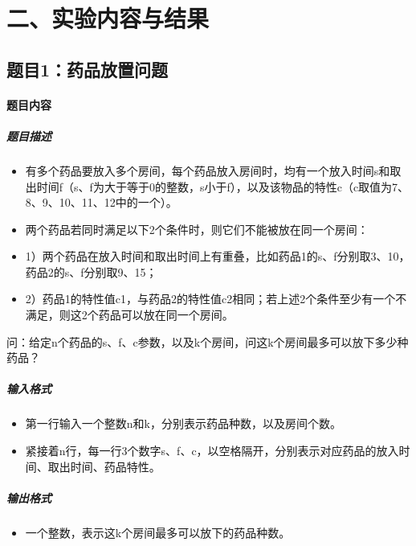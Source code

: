 \documentclass[12pt,a4paper]{ctexart}
\begin{document}
\vspace{5pt}

\section*{二、实验内容与结果}
\subsection*{题目1：药品放置问题}
\paragraph{题目内容}
\subparagraph{题目描述}
\begin{itemize}
    \item 有多个药品要放入多个房间，每个药品放入房间时，均有一个放入时间s和取出时间f（s、f为大于等于0的整数，s小于f），以及该物品的特性c（c取值为7、8、9、10、11、12中的一个）。
    \item 两个药品若同时满足以下2个条件时，则它们不能被放在同一个房间：
    \item 1）两个药品在放入时间和取出时间上有重叠，比如药品1的s、f分别取3、10，药品2的s、f分别取9、15；
    \item 2）药品1的特性值c1，与药品2的特性值c2相同；若上述2个条件至少有一个不满足，则这2个药品可以放在同一个房间。
\end{itemize}

问：给定n个药品的s、f、c参数，以及k个房间，问这k个房间最多可以放下多少种药品？

\subparagraph{输入格式}
    \begin{itemize}
        \item 第一行输入一个整数n和k，分别表示药品种数，以及房间个数。
        \item 紧接着n行，每一行3个数字s、f、c，以空格隔开，分别表示对应药品的放入时间、取出时间、药品特性。
    \end{itemize}
\subparagraph{输出格式}
    \begin{itemize}
        \item 一个整数，表示这k个房间最多可以放下的药品种数。
    \end{itemize}
\end{document}
